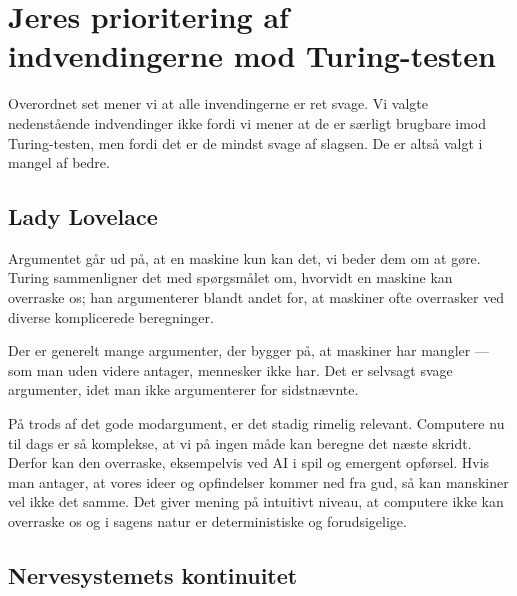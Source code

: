 \documentclass{article}
\begin{document}



\section{Jeres prioritering af indvendingerne mod Turing-testen}
Overordnet set mener vi at alle invendingerne er ret svage. Vi valgte nedenstående indvendinger ikke fordi vi mener at de er særligt brugbare imod Turing-testen, men fordi det er de mindst svage af slagsen. De er altså valgt i mangel af bedre. %
\subsection{Lady Lovelace}
Argumentet går ud på, at en maskine kun kan det, vi beder dem om at gøre. Turing sammenligner det med spørgsmålet om, hvorvidt en maskine kan overraske os; han argumenterer blandt andet for, at maskiner ofte overrasker ved diverse komplicerede beregninger.

Der er generelt mange argumenter, der bygger på, at maskiner har mangler --- som man uden videre antager, mennesker ikke har. Det er selvsagt svage argumenter, idet man ikke argumenterer for sidstnævnte.

På trods af det gode modargument, er det stadig rimelig relevant. Computere nu til dags er så komplekse, at vi på ingen måde kan beregne det næste skridt. Derfor kan den overraske, eksempelvis ved AI i spil og emergent opførsel. Hvis man antager, at vores ideer og opfindelser kommer ned fra gud, så kan manskiner vel ikke det samme. Det giver mening på intuitivt niveau, at computere ikke kan overraske os og i sagens natur er deterministiske og forudsigelige.

\subsection{Nervesystemets kontinuitet}
\end{document}
